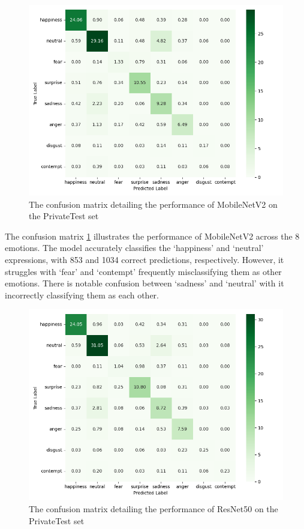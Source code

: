 \begin{figure}[H]
    \centering{}
    \includegraphics[scale=0.58]{fed_images/conf_matrix_MobileNetv2_percentage.png}
    \caption{The confusion matrix detailing the performance of MobileNetV2 on the PrivateTest set}
    \label{figure:conf_mnv2}
\end{figure}

The confusion matrix \ref{figure:conf_mnv2} illustrates the performance of MobileNetV2 across the 8 emotions. The model accurately classifies the `happiness' and `neutral' expressions, with 853 and 1034 correct predictions, respectively. However, it struggles with `fear' and `contempt' frequently misclassifying them as other emotions. There is notable confusion between `sadness' and `neutral' with it incorrectly classifying them as each other.

\begin{figure}[H]
    \centering{}
    \includegraphics[scale=0.58]{fed_images/conf_matrix_ResNet50_percentage.png}
    \caption{The confusion matrix detailing the performance of ResNet50 on the PrivateTest set}
    \label{figure:conf_rn50}
\end{figure}


